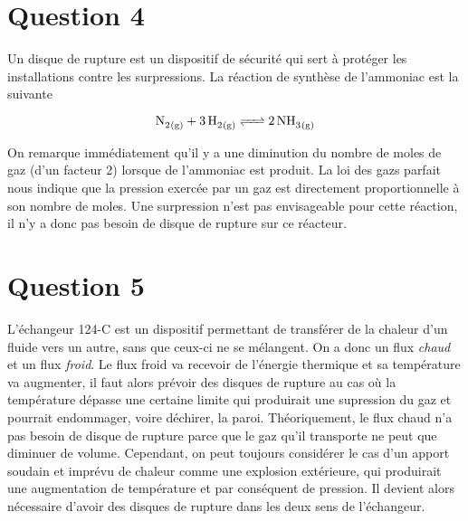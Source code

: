 \documentclass[a4paper,oneside,12pt]{article}
\begin{document}
\section*{Question 4}

Un disque de rupture est un dispositif de sécurité qui sert à protéger les installations 
contre les surpressions.
La réaction de synthèse de l'ammoniac est la suivante

\[
	\ce{N2_{(g)} + 3H2_{(g)} <=> 2NH3_{(g)}}
\]

On remarque immédiatement qu'il y a une diminution du nombre de moles de gaz (d'un facteur 2) 
lorsque de l'ammoniac est produit. La loi des gazs parfait nous indique que la pression
exercée par un gaz est directement proportionnelle à son nombre de moles.
Une surpression n'est pas envisageable pour cette réaction, 
il n'y a donc pas besoin de disque de rupture sur ce réacteur.

\section*{Question 5}

L'échangeur 124-C est un dispositif permettant de transférer de la chaleur d'un fluide
vers un autre, sans que ceux-ci ne se mélangent.
On a donc un flux \emph{chaud} et un flux \emph{froid}. Le flux froid va recevoir de 
l'énergie thermique et sa température va augmenter, il faut alors prévoir des disques 
de rupture au cas où la température dépasse une certaine limite qui produirait une 
supression du gaz et pourrait endommager, voire déchirer, la paroi.
Théoriquement, le flux chaud n'a pas besoin de disque de rupture parce que le gaz qu'il 
transporte ne peut que diminuer de volume. Cependant, on peut toujours considérer le cas
d'un apport soudain et imprévu de chaleur comme une explosion extérieure, qui produirait
une augmentation de température et par conséquent de pression. 
Il devient alors nécessaire d'avoir des disques de rupture dans les deux sens de l'échangeur.
\end{document}
